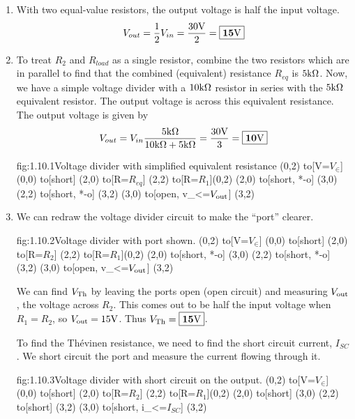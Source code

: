 \documentclass{article}
\begin{document}
    \begin{enumerate}
        \item 
        With two equal-value resistors, the output voltage is half the input voltage.
        \[V_{out} = \frac{1}{2}V_{in} = \frac{30\text{V}}{2} = \boxed{\mathbf{15\text{V}}}\]

        \item 
        To treat $R_2$ and $R_{load}$ as a single resistor, combine the two resistors which are in parallel to find that the combined (equivalent) resistance $R_{eq}$ is $5\text{k}\Omega$. Now, we have a simple voltage divider with a $10\text{k}\Omega$ resistor in series with the $5\text{k}\Omega$ equivalent resistor. The output voltage is across this equivalent resistance. The output voltage is given by 
        \[V_{out} = V_{in} \frac{5\text{k}\Omega}{10\text{k}\Omega + 5\text{k}\Omega} = \frac{30\text{V}}{3} = \boxed{\mathbf{10\text{V}}} \]
        \begin{circuit}{fig:1.10.1}{Voltage divider with simplified equivalent resistance}
            (0,2) to[V=$V_{\in}$] (0,0)
            to[short] (2,0)
            to[R=$R_{eq}$] (2,2)
            to[R=$R_1$](0,2)
            (2,0) to[short, *-o] (3,0)
            (2,2) to[short, *-o] (3,2)
            (3,0) to[open, v_<=$V_{\text{out}}$] (3,2)
        \end{circuit}


        \item 
        We can redraw the voltage divider circuit to make the ``port'' clearer. 
        \begin{circuit}{fig:1.10.2}{Voltage divider with port shown.}
            (0,2) to[V=$V_{\in}$] (0,0)
            to[short] (2,0)
            to[R=$R_2$] (2,2)
            to[R=$R_1$](0,2)
            (2,0) to[short, *-o] (3,0)
            (2,2) to[short, *-o] (3,2)
            (3,0) to[open, v_<=$V_{\text{out}}$] (3,2)
        \end{circuit}

        We can find $V_{\text{Th}}$ by leaving the ports open (open circuit) and measuring $V_{\text{out}}$, the voltage across $R_2$. This comes out to be half the input voltage when $R_1 = R_2$, so $V_{\text{out}} = 15\text{V}$. Thus $V_{\text{Th}} = \boxed{\mathbf{15\text{V}}}$.
        
        To find the Th\'evinen resistance, we need to find the short circuit current, $I_{SC}$. We short circuit the port and measure the current flowing through it.
        \begin{circuit}{fig:1.10.3}{Voltage divider with short circuit on the output.}
            (0,2) to[V=$V_{\in}$] (0,0) 
            to[short] (2,0)
            to[R=$R_2$] (2,2)
            to[R=$R_1$](0,2)
            (2,0) to[short] (3,0)
            (2,2) to[short] (3,2)
            (3,0) to[short, i_<=$I_{SC}$] (3,2) 
        \end{circuit}
        

\end{enumerate}
\end{document}
